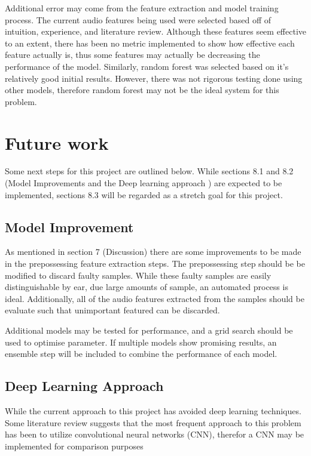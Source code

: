\documentclass{article}
\begin{document}
Additional error may come from the feature extraction and model training process. The current audio features being used were selected based off of intuition, experience, and literature review. Although these features seem effective to an extent, there has been no metric implemented to show how effective each feature actually is, thus some features may actually be decreasing the performance of the model. Similarly, random forest was selected based on it's relatively good initial results. However, there was not rigorous testing done using other models, therefore random forest may not be the ideal system for this problem.

\section{Future work}

Some next steps for this project are outlined below. While sections 8.1 and 8.2 (Model Improvements and the Deep learning approach ) are expected to be implemented, sections 8.3 will be regarded as a stretch goal for this project.

\subsection{Model Improvement}
As mentioned in section 7 (Discussion) there are some improvements to be made in the prepossessing feature extraction steps. The prepossessing step should be be modified to discard faulty samples. While these faulty samples are easily distinguishable by ear, due large amounts of sample, an automated process is ideal. Additionally, all of the audio features extracted from the samples should be evaluate such that unimportant featured can be discarded.

Additional models may be tested for performance, and a grid search should be used to optimise parameter. If multiple models show promising results, an ensemble step will be included to combine the performance of each model.

\subsection{Deep Learning Approach}

While the current approach to this project has avoided deep learning techniques. Some literature review suggests that the most frequent approach to this problem has been to utilize convolutional neural networks (CNN), therefor a CNN may be implemented for comparison purposes
\end{document}
